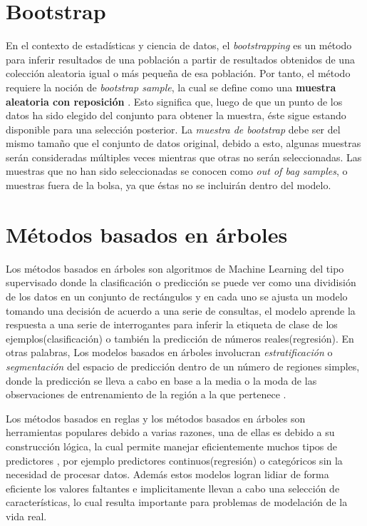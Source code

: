 \section{Bootstrap}
En el contexto de estadísticas y ciencia de datos, el \textit{bootstrapping} es un método para inferir resultados
de una población a partir de resultados obtenidos de una colección aleatoria igual o más pequeña de esa población. Por tanto, 
el método requiere la noción de \textit{bootstrap sample}, la cual se define como una \textbf{muestra aleatoria con reposición}
\cite{17}. Esto significa que, luego de que un punto de los datos ha sido elegido del conjunto para obtener la muestra, éste sigue 
estando disponible para una selección posterior. La \textit{muestra de bootstrap} debe ser del mismo tamaño que el conjunto de datos original\cite{18}, debido a esto, 
algunas muestras serán consideradas múltiples veces mientras que otras no serán seleccionadas. Las muestras que no han sido seleccionadas 
se conocen como \textit{out of bag samples}, o muestras fuera de la bolsa, ya que éstas no se incluirán dentro del modelo.

%
%
%
%
\section{Métodos basados en árboles}

Los métodos basados en árboles son algoritmos de Machine Learning del tipo supervisado donde la  
clasificación o predicción se puede ver como una dividisión de los datos en un conjunto de rectángulos \cite{13} y en
cada uno se ajusta un modelo tomando una decisión de acuerdo a una serie de consultas, el modelo
aprende la respuesta a una serie de interrogantes para inferir la etiqueta de clase de los
ejemplos(clasificación) o también la predicción de números reales(regresión). En otras palabras, 
Los modelos basados en árboles involucran \textit{estratificación} o \textit{segmentación} del 
espacio de predicción dentro de un número de regiones simples, donde la predicción se lleva a cabo 
en base a la media o la moda de las observaciones de entrenamiento de la región a la que pertenece \cite{14}.

Los métodos basados en reglas y los métodos basados en árboles son herramientas populares debido a varias razones,
una de ellas es debido a su construcción lógica\cite{18}, la cual permite manejar eficientemente muchos tipos de predictores
, por ejemplo predictores continuos(regresión) o categóricos sin la necesidad de procesar datos. Además
estos modelos logran lidiar de forma eficiente los valores faltantes e implicitamente llevan a cabo una selección de características,
lo cual resulta importante para problemas de modelación de la vida real.

